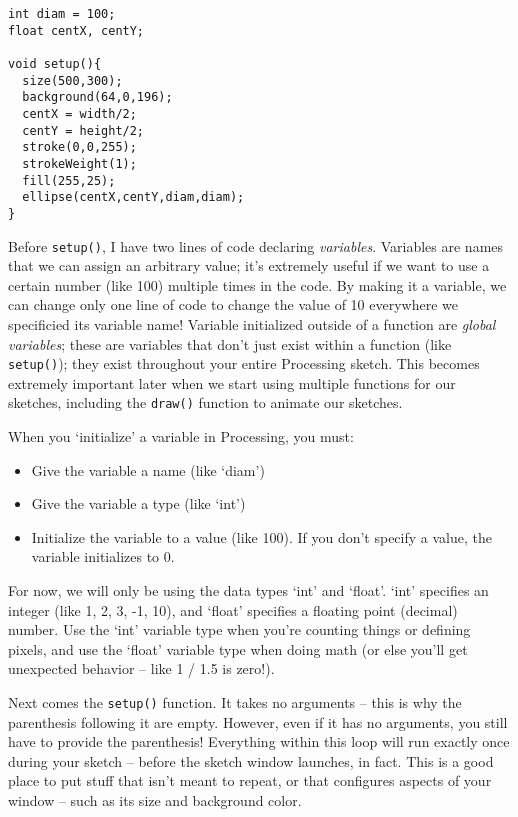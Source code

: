 \begin{verbatim}
int diam = 100;
float centX, centY;

void setup(){
  size(500,300);
  background(64,0,196);
  centX = width/2;
  centY = height/2;
  stroke(0,0,255);
  strokeWeight(1);
  fill(255,25);
  ellipse(centX,centY,diam,diam);
}
\end{verbatim}

Before \texttt{setup()}, I have two lines of code declaring \emph{variables}.  Variables are names that we can assign an arbitrary value; it's extremely useful if we want to use a certain number (like 100) multiple times in the code.  By making it a variable, we can change only one line of code to change the value of 10 everywhere we specificied its variable name!  Variable initialized outside of a function are \emph{global variables}; these are variables that don't just exist within a function (like \texttt{setup()}); they exist throughout your entire Processing sketch.  This becomes extremely important later when we start using multiple functions for our sketches, including the \texttt{draw()} function to animate our sketches.

When you `initialize' a variable in Processing, you must:
\begin{itemize}
\item Give the variable a name (like `diam')
\item Give the variable a type (like `int')
\item Initialize the variable to a value (like 100).  If you don't specify a value, the variable initializes to 0.
\end{itemize}

For now, we will only be using the data types `int' and `float'.  `int' specifies an integer (like 1, 2, 3, -1, 10), and `float' specifies a floating point (decimal) number.  Use the `int' variable type when you're counting things or defining pixels, and use the `float' variable type when doing math (or else you'll get unexpected behavior -- like 1 / 1.5 is zero!).

Next comes the \texttt{setup()} function.  It takes no arguments -- this is why the parenthesis following it are empty.  However, even if it has no arguments, you still have to provide the parenthesis!  Everything within this loop will run exactly once during your sketch -- before the sketch window launches, in fact.  This is a good place to put stuff that isn't meant to repeat, or that configures aspects of your window -- such as its size and background color.

